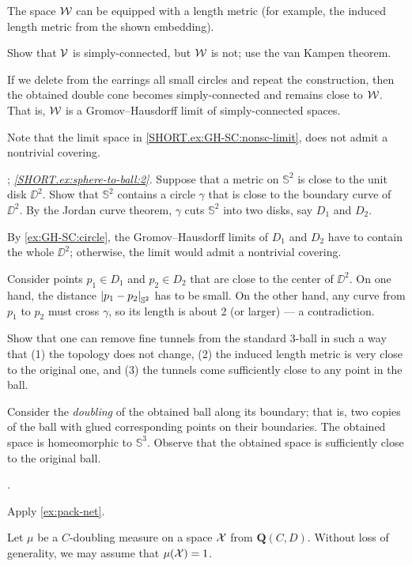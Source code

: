 The space $\mathcal{W}$ can be equipped with a length metric
(for example, the induced length metric from the shown embedding).

Show that $\mathcal{V}$ is simply-connected, but $\mathcal{W}$ is not; use the van Kampen theorem.

If we delete from the earrings all small circles and repeat the construction,
then the obtained double cone becomes simply-connected and remains close to $\mathcal{W}$.
That is, $\mathcal{W}$ is a Gromov--Hausdorff limit of simply-connected spaces.

Note that the limit space in \ref{SHORT.ex:GH-SC:nonsc-limit}, does not admit a nontrivial covering.

\parbf{\ref{ex:sphere-to-ball}};
\textit{\ref{SHORT.ex:sphere-to-ball:2}.}
Suppose that a metric on $\mathbb{S}^2$ is close to the unit disk $\DD^2$.
Show that $\mathbb{S}^2$ contains a circle $\gamma$ that is close to the boundary curve of $\DD^2$.
By the Jordan curve theorem, $\gamma$ cuts $\mathbb{S}^2$ into two disks, say $D_1$ and $D_2$.

By \ref{ex:GH-SC:circle}, the Gromov--Hausdorff limits of $D_1$ and $D_2$ have to contain the whole $\DD^2$; otherwise, the limit would admit a nontrivial covering.

Consider points $p_1\in D_1$ and $p_2\in D_2$ that are close to the center of $\DD^2$.
On one hand, the distance $\dist{p_1}{p_2}{\mathbb{S}^2}$ has to be small.
On the other hand, any curve from $p_1$ to $p_2$ must cross $\gamma$, so its length is about 2 (or larger) --- a contradiction.

Show that one can remove fine tunnels from the standard 3-ball in such a way that (1) the topology does not change, (2) the induced length metric is very close to the original one, and (3) the tunnels come sufficiently close to any point in the ball.

Consider the \emph{doubling} of the obtained ball along its boundary;
that is, two copies of the ball with glued corresponding points on their boundaries.
The obtained space is homeomorphic to $\mathbb{S}^3$.
Observe that the obtained space is sufficiently close to the original ball.

 \cite[Exercises 7.5.13 and 7.5.17]{burago-burago-ivanov}. 

 Apply \ref{ex:pack-net}.

Let $\mu$ be a $C$-doubling measure on a space $\mathcal{X}$ from $\bm{Q}(C,D)$.
Without loss of generality, we may assume that $\mu(\spc{X})\z=1$.

